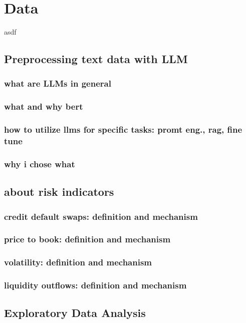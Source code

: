 \chapter{Data}\label{sec2}
\thispagestyle{empty}

asdf

\section{Preprocessing text data with LLM}

\subsection{what are LLMs in general}

\subsection{what and why bert}

\subsection{how to utilize llms for specific tasks: promt eng., rag, fine tune}

\subsection{why i chose what}

\section{about risk indicators}

\subsection{credit default swaps: definition and mechanism}

\subsection{price to book: definition and mechanism}

\subsection{volatility: definition and mechanism}

\subsection{liquidity outflows: definition and mechanism}

\section{Exploratory Data Analysis}

\cleardoublepage
